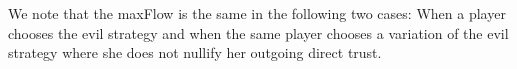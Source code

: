 \documentclass[11pt]{llncs}
\theoremstyle{definition}
\begin{document}


     We note that the maxFlow is the same in the following two cases: When a player chooses the evil strategy and when the
     same player chooses a variation of the evil strategy where she does not nullify her outgoing direct trust.
\end{document}
